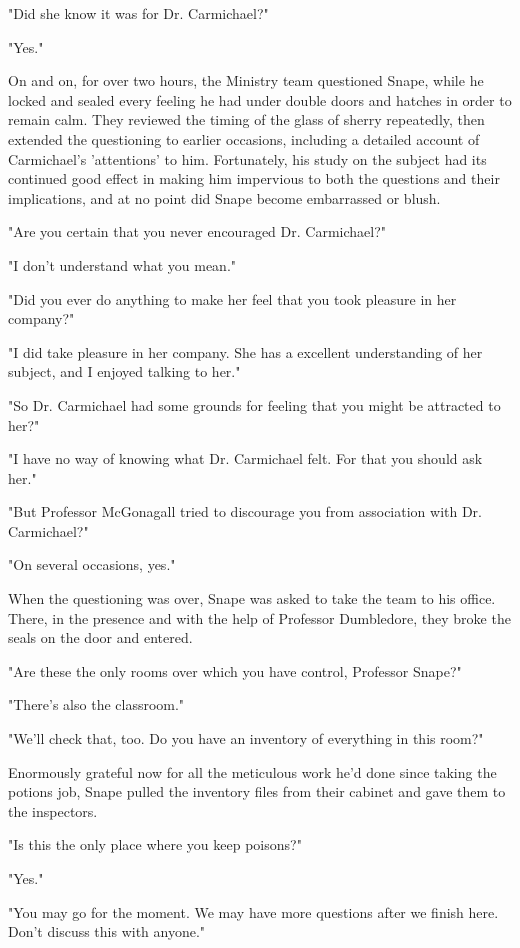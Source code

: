 \documentclass[a4paper,11pt]{article}
\begin{document}
"Did she know it was for Dr. Carmichael?"

"Yes."

On and on, for over two hours, the Ministry team questioned Snape, while he locked and sealed every feeling he had under double doors and hatches in order to remain calm. They reviewed the timing of the glass of sherry repeatedly, then extended the questioning to earlier occasions, including a detailed account of Carmichael's 'attentions' to him. Fortunately, his study on the subject had its continued good effect in making him impervious to both the questions and their implications, and at no point did Snape become embarrassed or blush.

"Are you certain that you never encouraged Dr. Carmichael?"

"I don't understand what you mean."

"Did you ever do anything to make her feel that you took pleasure in her company?"

"I did take pleasure in her company. She has a excellent understanding of her subject, and I enjoyed talking to her."

"So Dr. Carmichael had some grounds for feeling that you might be attracted to her?"

"I have no way of knowing what Dr. Carmichael felt. For that you should ask her."

"But Professor McGonagall tried to discourage you from association with Dr. Carmichael?"

"On several occasions, yes."

When the questioning was over, Snape was asked to take the team to his office. There, in the presence and with the help of Professor Dumbledore, they broke the seals on the door and entered.

"Are these the only rooms over which you have control, Professor Snape?"

"There's also the classroom."

"We'll check that, too. Do you have an inventory of everything in this room?"

Enormously grateful now for all the meticulous work he'd done since taking the potions job, Snape pulled the inventory files from their cabinet and gave them to the inspectors.

"Is this the only place where you keep poisons?"

"Yes."

"You may go for the moment. We may have more questions after we finish here. Don't discuss this with anyone."
\end{document}
